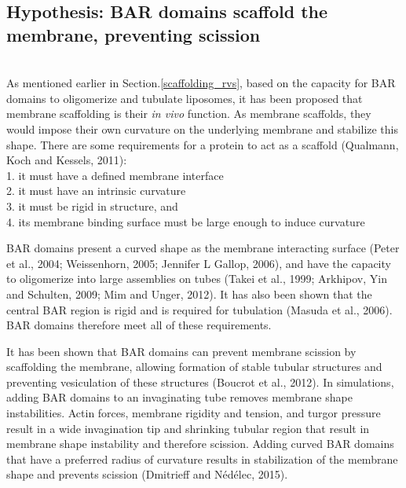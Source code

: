 \subsection{Hypothesis: BAR domains scaffold the membrane, preventing scission}
				\mbox{}\\
As mentioned earlier in Section.\ref{scaffolding_rvs}, based on the capacity for BAR domains to oligomerize and tubulate liposomes, it has been proposed that membrane scaffolding is their \textit{in vivo} function. As membrane scaffolds, they would impose their own curvature on the underlying membrane and stabilize this shape. There are some requirements for a protein to act as a scaffold (Qualmann, Koch and Kessels, 2011):\\
	1. it must have a defined membrane interface\\
	2. it must have an intrinsic curvature\\
	3. it must be rigid in structure, and\\
	4. its membrane binding surface must be large enough to induce curvature\\

\vspace{-1mm}

BAR domains present a curved shape as the membrane interacting surface (Peter et al., 2004; Weissenhorn, 2005; Jennifer L Gallop, 2006), and have the capacity to oligomerize into large assemblies on tubes (Takei et al., 1999; Arkhipov, Yin and Schulten, 2009; Mim and Unger, 2012). It has also been shown that the central BAR region is rigid and is required for tubulation (Masuda et al., 2006). BAR domains therefore meet all of these requirements. 

	\vspace{5mm}
It has been shown that BAR domains can prevent membrane scission by scaffolding the membrane, allowing formation of stable tubular structures and preventing vesiculation of these structures (Boucrot et al., 2012). In simulations, adding BAR domains to an invaginating tube removes membrane shape instabilities. Actin forces, membrane rigidity and tension, and turgor pressure result in a wide invagination tip and shrinking tubular region that result in membrane shape instability and therefore scission. Adding curved BAR domains that have a preferred radius of curvature results in stabilization of the membrane shape and prevents scission (Dmitrieff and Nédélec, 2015).

